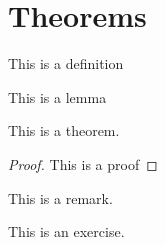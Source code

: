 
\section{Theorems}

\begin{defn}
This is a definition
\end{defn}

\begin{lem}
This is a lemma
\end{lem}

\begin{theo}
This is a theorem.
\begin{proof}
This is a proof
\end{proof}
\end{theo}

\begin{rmk}
This is a remark.
\end{rmk}

\begin{exc}
This is an exercise.
\end{exc}

